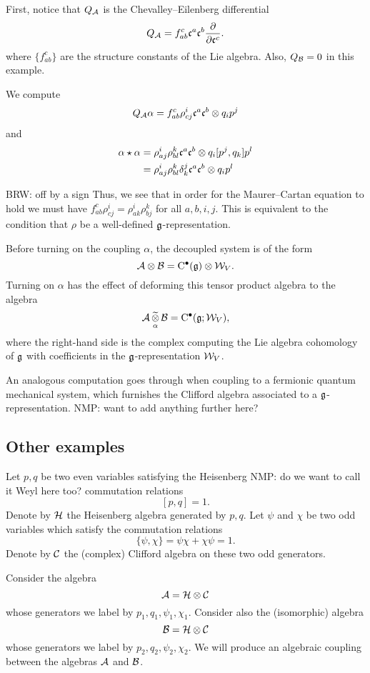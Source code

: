 \documentclass[11pt]{amsart}
\def\brian#1{{\textcolor{blue!65!red}{BRW: {#1}}}}
\def\natalie#1{{\textcolor{green!65!black}{NMP: {#1}}}}
\begin{document}
First, notice that $Q_{\mathcal A}$ is the Chevalley--Eilenberg differential 
\[
Q_{\mathcal A} = f_{ab}^c \mathfrak c^a \mathfrak c^b \frac{\partial}{\partial \mathfrak c^c} .
\]
where $\{f_{ab}^c\}$ are the structure constants of the Lie algebra. 
Also, $Q_{\mathcal B} = 0$ in this example. 

We compute
\[
Q_{\mathcal A} \alpha = f_{ab}^c \rho_{cj}^i \mathfrak c^a \mathfrak c^b \otimes q_i p^j 
\]
and
\begin{align*}
\alpha \star \alpha & = \rho_{aj}^i \rho_{bl}^k \mathfrak c^a \mathfrak c^b \otimes q_i [p^j, q_k] p^l \\
& = \rho_{aj}^i \rho_{bl}^k \delta^j_k \mathfrak c^a \mathfrak c^b \otimes q_i p^l 
\end{align*}

\brian{off by a sign}
Thus, we see that in order for the Maurer--Cartan equation to hold we must have $f_{ab}^c \rho_{cj}^i = \rho^i_{ak} \rho^k_{bj}$ for all $a,b,i,j$. 
This is equivalent to the condition that $\rho$ be a well-defined $\mathfrak g$-representation. 

Before turning on the coupling $\alpha$, the decoupled system is of the form
\[
\mathcal A \otimes \mathcal B = {\rm C}^\bullet(\mathfrak g) \otimes \mathcal W_V . 
\]
Turning on $\alpha$ has the effect of deforming this tensor product algebra to the algebra
\[
\mathcal A \, \underset{\alpha}{\widetilde{\otimes}} \, \mathcal B = {\rm C}^\bullet(\mathfrak g ; \mathcal W_V) ,
\]
where the right-hand side is the complex computing the Lie algebra cohomology of $\mathfrak g$ with coefficients in the $\mathfrak g$-representation $\mathcal W_V$. 

An analogous computation goes through when coupling to a fermionic quantum mechanical system, which furnishes the Clifford algebra associated to a $\mathfrak g$-representation. \natalie{want to add anything further here?}

\subsection{Other examples}

Let $p,q$ be two even variables satisfying the Heisenberg \natalie{do we want to call it Weyl here too?} commutation relations
\[
[p,q] = 1.
\]
Denote by $\mathcal H$ the Heisenberg algebra generated by $p,q$. 
Let $\psi$ and $\chi$ be two odd variables which satisfy the commutation relations
\[
\{\psi, \chi\} = \psi \chi + \chi \psi = 1.
\]
Denote by $\mathcal C$ the (complex) Clifford algebra on these two odd generators.

Consider the algebra 
\[
\mathcal A = \mathcal H\otimes \mathcal C 
\]
whose generators we label by $p_1,q_1,\psi_1,\chi_1$.
Consider also the (isomorphic) algebra
\[
\mathcal B = \mathcal H \otimes \mathcal C
\]
whose generators we label by $p_2,q_2,\psi_2,\chi_2$.
We will produce an algebraic coupling between the algebras $\mathcal A$ and $\mathcal B$. 
\end{document}
